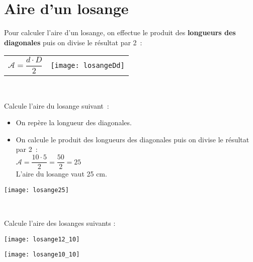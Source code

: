 
\newpage


\section{Aire d'un losange}

\vspace{2em}

\begin{aconnaitre}
Pour calculer l’aire d’un losange, on effectue le produit des \textbf{\textcolor{H1}{longueurs des diagonales}} puis on divise le résultat par 2 : 

\begin{tabularx}{\textwidth}{XX}
{\large $\mathcal{A} = \dfrac{d \cdot D}{2}$} & \texttt{[image: losangeDd]} \\
 \end{tabularx} \\
 \end{aconnaitre}

\vspace{4em}

\begin{methode*1}


 
 \begin{exemple*1}
Calcule l’aire du losange suivant :
\begin{minipage}[c]{0.68\textwidth}
\begin{itemize}
 \item On repère la longueur des diagonales.
 \item On calcule le produit des longueurs des diagonales puis on divise le résultat par 2 : \\[0.3em]
$\mathcal{A} = \dfrac{10 \cdot 5}{2} = \dfrac{50}{2} = 25$ \\[0.3em]
L'aire du losange vaut 25 cm.
 \end{itemize}
 \end{minipage} \hfill%
 \begin{minipage}[c]{0.2\textwidth}
 \texttt{[image: losange25]}
 \end{minipage} \\
\end{exemple*1}

 
 \exercice
Calcule l’aire des losanges suivants :
\begin{colenumerate}{2}
 \item
 
 \texttt{[image: losange12\_10]}
 \item
 
 \texttt{[image: losange10\_10]}
 \end{colenumerate}

\end{methode*1}
